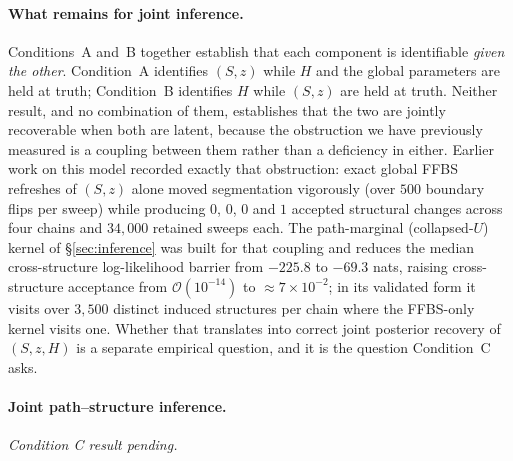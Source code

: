 \paragraph{What remains for joint inference.}
\label{par:remains-for-joint}
Conditions~A and~B together establish that each component is identifiable
\emph{given the other}. Condition~A identifies $(S, z)$ while $H$ and the global
parameters are held at truth; Condition~B identifies $H$ while $(S, z)$ are held
at truth. Neither result, and no combination of them, establishes that the two
are jointly recoverable when both are latent, because the obstruction we have
previously measured is a coupling between them rather than a deficiency in
either. Earlier work on this model recorded exactly that obstruction: exact
global FFBS refreshes of $(S,z)$ alone moved segmentation vigorously (over $500$
boundary flips per sweep) while producing $0$, $0$, $0$ and $1$ accepted
structural changes across four chains and $34{,}000$ retained sweeps each. The
path-marginal (collapsed-$U$) kernel of \S\ref{sec:inference} was built for that
coupling and reduces the median cross-structure log-likelihood barrier from
$-225.8$ to $-69.3$ nats, raising cross-structure acceptance from
$\mathcal{O}(10^{-14})$ to $\approx 7\times 10^{-2}$; in its validated form it
visits over $3{,}500$ distinct induced structures per chain where the
FFBS-only kernel visits one. Whether that translates into correct joint
posterior recovery of $(S, z, H)$ is a separate empirical question, and it is
the question Condition~C asks.

\paragraph{Joint path--structure inference.}
\textit{Condition C result pending.}

